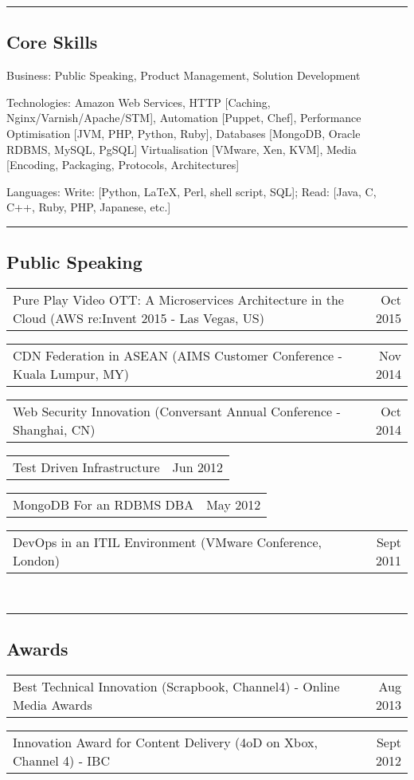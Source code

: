 \documentclass[10pt,a4paper]{article}
\makeatletter
\newenvironment{indentsection}[1]%
{\begin{list}{}%
    {\setlength{\leftmargin}{#1}}%
    \item[]%
}
{\end{list}}
\newcommand{\headerrow}[2]
{\begin{tabular*}{\linewidth}{l@{\extracolsep{\fill}}r}
    #1 &
    #2 \\
\end{tabular*}}
\makeatother
\begin{document}
\hrule
\vspace{-0.4em}
\subsection*{Core Skills}

\begin{indentsection}{\parindent}
\begin{description*}
    \item[Business:]
    Public Speaking, Product Management, Solution Development 
    \item[Technologies:]
    Amazon Web Services, HTTP [Caching, Nginx/Varnish/Apache/STM], Automation [Puppet, Chef], Performance Optimisation [JVM, PHP, Python, Ruby], Databases [MongoDB, Oracle RDBMS, MySQL, PgSQL] Virtualisation [VMware, Xen, KVM], Media [Encoding, Packaging, Protocols, Architectures]
    \item[Languages:]
    Write: [Python, \LaTeX, Perl, shell script, SQL]; Read: [Java, C, C++, Ruby, PHP, Japanese, etc.]
\end{description*}
\end{indentsection}

\hrule
\vspace{-0.4em}
\subsection*{Public Speaking}
    \headerrow
        {Pure Play Video OTT: A Microservices Architecture in the Cloud (AWS re:Invent 2015 - Las Vegas, US)}
        {Oct 2015}
    \headerrow
        {CDN Federation in ASEAN (AIMS Customer Conference - Kuala Lumpur, MY)}
        {Nov 2014}
    \headerrow
        {Web Security Innovation (Conversant Annual Conference - Shanghai, CN)}
        {Oct 2014}
    \headerrow
        {Test Driven Infrastructure}
        {Jun 2012}
    \headerrow
        {MongoDB For an RDBMS DBA}
        {May 2012}
    \headerrow
        {DevOps in an ITIL Environment (VMware Conference, London)}
        {Sept 2011}
\\
\hrule
\vspace{-0.4em}
\subsection*{Awards}
    \headerrow
        {Best Technical Innovation (Scrapbook, Channel4) - Online Media Awards}
        {Aug 2013}
    \headerrow
        {Innovation Award for Content Delivery (4oD on Xbox, Channel 4) - IBC}
        {Sept 2012}
\end{document}

